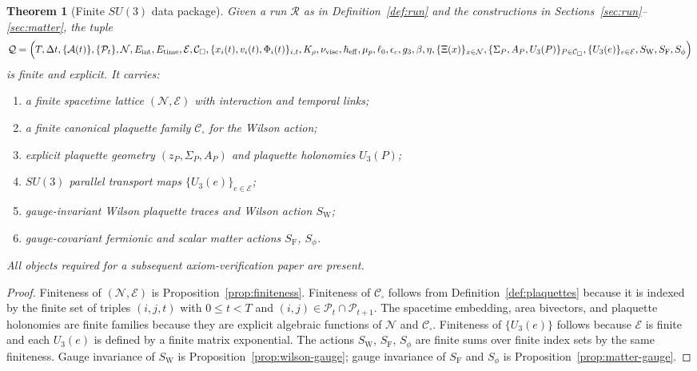 \documentclass[11pt]{article}
\newtheorem{theorem}{Theorem}[section]
\theoremstyle{remark}
\newcommand{\mcN}{\mathcal N}
\newcommand{\mcE}{\mathcal E}
\begin{document}
\begin{theorem}[Finite $SU(3)$ data package]
\label{thm:package}
Given a run $\mathscr R$ as in Definition~\ref{def:run} and the constructions
in Sections~\ref{sec:run}--\ref{sec:matter}, the tuple
\[
\mathcal Q=
\Bigl(
T,\Delta t,\{\mathcal A(t)\},\{\mathcal P_t\},\mcN,E_{\mathrm{int}},E_{\mathrm{time}},\mcE,\mathcal C_\square,
\{x_i(t),v_i(t),\Phi_i(t)\}_{i,t},K_\rho,\nu_{\mathrm{visc}},
\hbar_{\mathrm{eff}},\mu_p,\ell_0,\epsilon_c,g_3,\beta,\eta,
\{\Xi(x)\}_{x\in\mcN},\{\Sigma_P,A_P,U_3(P)\}_{P\in\mathcal C_\square},
\{U_3(e)\}_{e\in\mcE},S_{\mathrm W},S_{\mathrm F},S_\phi
\Bigr)
\]
is finite and explicit.
It carries:
\begin{enumerate}[leftmargin=1.5em]
\item a finite spacetime lattice $(\mcN,\mcE)$ with interaction and temporal links;
\item a finite canonical plaquette family $\mathcal C_\square$ for the Wilson action;
\item explicit plaquette geometry $(z_P,\Sigma_P,A_P)$ and plaquette holonomies $U_3(P)$;
\item $SU(3)$ parallel transport maps $\{U_3(e)\}_{e\in\mcE}$;
\item gauge-invariant Wilson plaquette traces and Wilson action $S_{\mathrm W}$;
\item gauge-covariant fermionic and scalar matter actions $S_{\mathrm F}$, $S_\phi$.
\end{enumerate}
All objects required for a subsequent axiom-verification paper are present.
\end{theorem}
\begin{proof}
Finiteness of $(\mcN,\mcE)$ is Proposition~\ref{prop:finiteness}.
Finiteness of $\mathcal C_\square$ follows from Definition~\ref{def:plaquettes}
because it is indexed by the finite set of triples $(i,j,t)$ with
$0\le t<T$ and $(i,j)\in\mathcal P_t\cap\mathcal P_{t+1}$.
The spacetime embedding, area bivectors, and plaquette holonomies are finite
families because they are explicit algebraic functions of $\mcN$ and
$\mathcal C_\square$.
Finiteness of $\{U_3(e)\}$ follows because $\mcE$ is finite and each $U_3(e)$
is defined by a finite matrix exponential.
The actions $S_{\mathrm W}$, $S_{\mathrm F}$, $S_\phi$ are finite sums over
finite index sets by the same finiteness.
Gauge invariance of $S_{\mathrm W}$ is Proposition~\ref{prop:wilson-gauge};
gauge invariance of $S_{\mathrm F}$ and $S_\phi$ is
Proposition~\ref{prop:matter-gauge}.
\end{proof}
\end{document}
